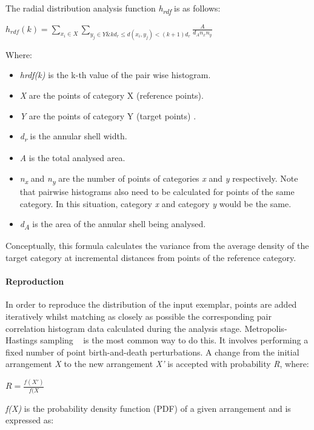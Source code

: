 The radial distribution analysis function \textit{h\textsubscript{rdf}} is as follows:\\
\begin{center}	
$h_{rdf}(k) = \sum_{x_{i} \in X} \sum_{y_{j} \in Y \&  
kd_{r} \leq d(x_{i}, y_{j}) < (k+1)d_{r} } \frac{A}{d_{A}n_{x}n_{y}} $
\end{center}
Where:
\begin{itemize}
\item \textit{hrdf(k)} is the k-th value of the pair wise histogram.
\item \textit{X} are the points of category X (reference points).
\item \textit{Y} are the points of category Y (target points)    .
\item \textit{d\textsubscript{r}} is the annular shell width.
\item \textit{A} is the total analysed area.
\item \textit{n\textsubscript{x}} and \textit{n\textsubscript{y}} are the number of points of categories \textit{x} and \textit{y} respectively. Note that pairwise histograms also need to be calculated for points of the same category. In this situation, category \textit{x} and category \textit{y} would be the same.
\item \textit{d\textsubscript{A}} is the area of the annular shell being analysed.
\end{itemize}

Conceptually, this formula calculates the variance from the average density of the target category at incremental distances from points of the reference category.\\

\paragraph{Reproduction}

In order to reproduce the distribution of the input exemplar, points are added iteratively whilst matching as closely as possible the corresponding pair correlation histogram data calculated during the analysis stage. Metropolis-Hastings sampling ~\cite{Hurtut2009} is the most common way to do this. It involves performing a fixed number of point birth-and-death perturbations. A change from the initial arrangement \textit{X} to the new arrangement \textit{X'} is accepted with probability \textit{R}, where:

\begin{center}
$ R = \frac{f(X')}{f(X}$
\end{center}
\textit{f(X)} is the probability density function (PDF) of a given arrangement and is expressed as:\\

